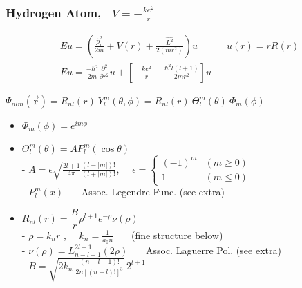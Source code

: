 \documentclass[12pt]{article}
\begin{document}
%
%
\newpage
\subsubsection{Hydrogen Atom, \ \(V = - \frac{ke^2}{r}\)}
\unskip
\begin{gather*}
    E u = \left( \frac{\hat{p}_r^2}{2m} + V(r) + \frac{\hat{L^2}}{2(mr^2)} \right) u
        \hspace{18pt} \hspace{18pt} u(r) = r R(r) \\[10pt]
    \boxed{ E u = \frac{-\hbar^2}{2m} \frac{\partial^2}{\partial r^2} u
        + \left[ - \frac{ke^2}{r} + \frac{\hbar^2 l(l+1)}{2m r^2} \right] u }
\end{gather*}

\vspace{10pt} \noindent
\( \boxed{ \Psi_{nlm}(\vec{\mathbf{r}}) = R_{nl}(r) \ Y^m_l(\theta, \phi) 
    = R_{nl}(r) \ \Theta^m_l(\theta) \ \Phi_m(\phi) } \)

\noindent
\begin{minipage}[t]{.47\textwidth}
    \begin{itemize}
        \item \( \Phi_m(\phi) = e^{i m \phi}\)
        \item \( \Theta^m_l(\theta) = A P^m_l(\cos{\theta}) \)\\[5pt]
        - \( A = \epsilon \sqrt{ \frac{2l+1}{4\pi} \frac{(l-|m|)!}{(l+|m|)!} } \), \ \
            \( \epsilon = \begin{cases}
                \scriptstyle (-1)^m & \scriptstyle (m \geq 0) \\
                \scriptstyle1       & \scriptstyle (m \leq 0)
            \end{cases} \)\\[5pt]
        - \( P^m_l(x) \) \ \ \ {\scriptsize{Assoc. Legendre Func. (see extra)}}
    \end{itemize}   
\end{minipage}
\begin{minipage}[t]{.52\textwidth}
    \begin{itemize}
        \item \( R_{nl}(r) = \dfrac{B}{r} \rho^{l+1} e^{-\rho} \nu(\rho) \)\\[5pt]
        - \( \rho = k_n r \) , \ \ \( k_n = \frac{1}{a_0 n} \) 
            \ \ \ {\scriptsize(fine structure below)} \\[10pt]
        - \( \nu(\rho) = L^{2l+1}_{n-l-1}(2\rho) \) 
            \ \ \ {\scriptsize{Assoc. Laguerre Pol. (see extra)}} \\[10pt]
        - \( B = \sqrt{2 k_n \ \frac{ ( n-l-1 )! }{ 2n [ (n+l)! ]^3 }} \ 2^{l+1} \) 
    \end{itemize}     
\end{minipage}
\end{document}
